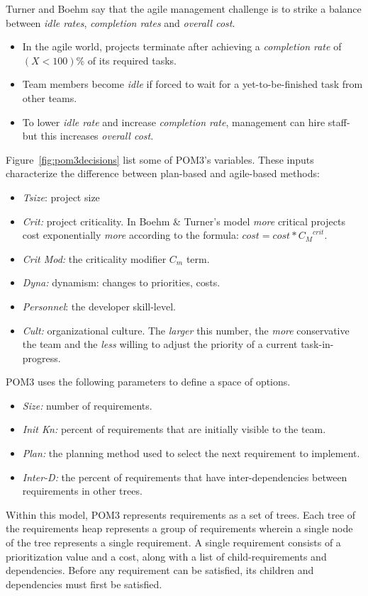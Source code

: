 \documentclass[10pt,journal,compsoc]{IEEEtran}
\newcommand{\bi}{\begin{itemize}}
\newcommand{\ei}{\end{itemize}}
\newcommand{\fig}[1]{Figure~\ref{fig:#1}}
\newenvironment{changed}{\par\color{MyDarkBlue}}{\par}
\begin{document}
\begin{changed}
Turner and Boehm say that the agile
management challenge is to strike a balance between {\em idle rates},
{\em completion rates} and {\em overall cost}. 
\bi
\item
In the agile world, projects terminate after achieving a 
{\em completion rate} of   $(X<100)$\% of its required tasks.
\item
Team members  become
{\em idle} if forced to wait for a yet-to-be-finished task from other teams. 
\item
To lower {\em idle rate} and  
increase {\em completion rate}, management can hire staff- but this
increases  {\em overall cost}.
\ei
\end{changed}
\fig{pom3decisions}  list some of POM3's variables.
These inputs
characterize the difference
between plan-based and agile-based methods:
\bi
\item {\em Tsize}: project size
\item {\em Crit:} project criticality. In Boehm \& Turner's model
 {\em more} critical projects cost exponentially {\em more} 
according to the formula: $\textit{cost} = \textit{cost} * {C_M}^{\textit{crit}}$.
\item {\em Crit Mod:} the criticality modifier $C_m$ term.
\item {\em Dyna:} dynamism: changes to priorities, costs.
\item {\em Personnel}: the developer skill-level.
\item  {\em Cult:} organizational culture. The {\em larger} this number, the {\em more} conservative
the team and the {\em less} willing to adjust the priority of a current task-in-progress.
\ei
POM3 uses the following parameters to define a space of options.
\bi
\item {\em Size:} number of requirements.
\item {\em Init Kn:} percent of requirements that are initially visible to the team.
\item {\em Plan:} the planning method used to select the next requirement to implement.
\item {\em Inter-D:}  the percent of requirements that have inter-dependencies 
between requirements in other trees.
\ei

  Within this model, POM3 represents requirements as a set of trees.  
    Each tree of the requirements
    heap represents a group of requirements wherein a single node of the
    tree represents a single requirement.  A single requirement consists
    of a prioritization value and a cost, along with a list of
    child-requirements and dependencies.  Before any requirement can be
    satisfied, its children and dependencies must first be satisfied.
    
\end{document}
